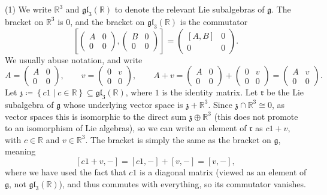 \documentclass[11pt, letterpaper]{article}
\theoremstyle{plain}
\begin{document}
(1) We write $\mathbb{R} ^3$ and $\mathfrak{gl} _3(\mathbb{R} )$ to denote the relevant Lie subalgebras of $\mathfrak{g} $. The bracket on $\mathbb{R} ^3$ is 0, and the bracket on $\mathfrak{gl} _3(\mathbb{R} )$ is the commutator
\[
	\left[ \begin{pmatrix}
	A & 0 \\
	0 & 0
	\end{pmatrix},\begin{pmatrix}
	B & 0 \\
	0 & 0
	\end{pmatrix} \right] =\begin{pmatrix}
	\left[ A,B \right]  & 0 \\
	0 & 0
	\end{pmatrix}
.\]
We usually abuse notation, and write
\[
	A=\begin{pmatrix}
	A & 0 \\
	0 & 0
	\end{pmatrix},\qquad v=\begin{pmatrix}
	0 & v \\
	0 & 0
	\end{pmatrix},\qquad A+v=\begin{pmatrix}
	A & 0 \\
	0 & 0
	\end{pmatrix}+\begin{pmatrix}
	0 & v \\
	0 & 0
	\end{pmatrix}=\begin{pmatrix}
	A & v \\
	0 & 0
	\end{pmatrix}
.\]
Let $\mathfrak{z} \coloneqq \left\{ c1\mid c\in\mathbb{R}  \right\} \subseteq \mathfrak{gl}_3(\mathbb{R} )$, where $1$ is the identity matrix. Let $\mathfrak{r} $ be the Lie subalgebra of $\mathfrak{g} $ whose underlying vector space is $\mathfrak{z} +\mathbb{R} ^3$. Since $\mathfrak{z} \cap \mathbb{R} ^3\cong 0$, as vector spaces this is isomorphic to the direct sum $\mathfrak{z} \oplus \mathbb{R} ^3$ (this does not promote to an isomorphism of Lie algebras), so we can write an element of $\mathfrak{r} $ as $c1+v$, with $c\in\mathbb{R} $ and $v\in\mathbb{R} ^3$. The bracket is simply the same as the bracket on $\mathfrak{g} $, meaning
\[
	[c1+v,-] = [c1,-] + [v,-] = [v,-],
\]
where we have used the fact that $c1$ is a diagonal matrix (viewed as an element of $\mathfrak{g} $, not $\mathfrak{gl} _3(\mathbb{R} )$), and thus commutes with everything, so its commutator vanishes.
\end{document}
